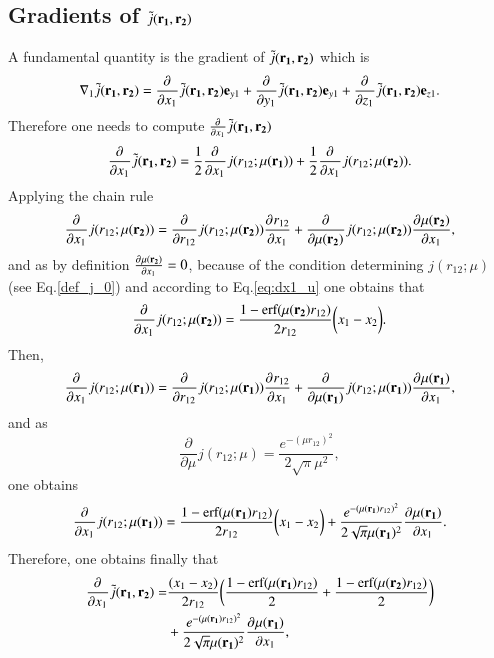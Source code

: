 \documentclass[aip,jcp,reprint,noshowkeys,superscriptaddress]{revtex4-1}
\newcommand{\deriv}[3]{\frac{\partial^{#3} #1}{\partial {#2}^{#3}}}
\newcommand{\bd}[1]{{\bf {#1}}}
\newcommand{\mur}[1]{\mu({\bf r_{#1}})}
\begin{document}
\subsection{Gradients of $\tilde{j}(\bd{r_1},\bd{r_2})$}
A fundamental quantity is the gradient of $\tilde{j}(\bd{r_1},\bd{r_2})$ which is 
\begin{equation}
 \nabla_1 \tilde{j}(\bd{r_1},\bd{r_2}) = \deriv{}{x_1}{} \tilde{j}(\bd{r_1},\bd{r_2}) {\bf e}_{y1} + \deriv{}{y_1}{} \tilde{j}(\bd{r_1},\bd{r_2}) {\bf e}_{y1} + \deriv{}{z_1}{} \tilde{j}(\bd{r_1},\bd{r_2}) {\bf e}_{z1}.
\end{equation}
Therefore one needs to compute $\deriv{}{x_1}{} \tilde{j}(\bd{r_1},\bd{r_2})$
\begin{equation}
 \deriv{}{x_1}{} \tilde{j}(\bd{r_1},\bd{r_2}) = \frac{1}{2}\deriv{}{x_1}{} j(r_{12};\mur{1}) 
                                               +\frac{1}{2}\deriv{}{x_1}{} j(r_{12};\mur{2}) .
\end{equation}
Applying the chain rule 
\begin{equation}
 \deriv{}{x_1}{} j(r_{12};\mur{2}) = \deriv{}{r_{12}}{} j(r_{12};\mur{2})\deriv{r_{12}}{x_1}{} + \deriv{}{\mur{2}}{}j(r_{12};\mur{2}) \deriv{\mur{2}}{x_1}{},
\end{equation}
and as by definition $\deriv{\mur{2}}{x_1}{} = 0$, because 
of the condition determining $j(r_{12};\mu)$ (see Eq.\eqref{def_j_0}) and according to Eq.\eqref{eq:dx1_u} one obtains that 
\begin{equation}
 \deriv{}{x_1}{} j(r_{12};\mur{2}) = \frac{1 - \text{erf}(\mur{2} r_{12})}{2 r_{12}} \bigg(x_1 - x_2 \bigg).
\end{equation}
Then, 
\begin{equation}
 \deriv{}{x_1}{} j(r_{12};\mur{1}) = \deriv{}{r_{12}}{} j(r_{12};\mur{1})\deriv{r_{12}}{x_1}{} + \deriv{}{\mur{1}}{}j(r_{12};\mur{1}) \deriv{\mur{1}}{x_1}{},
\end{equation}
and as 
\begin{equation}
 \label{eq:d_dmu_j}
 \deriv{}{\mu}{}j(r_{12};\mu) = \frac{e^{-(\mu r_{12})^2}}{2\sqrt{\pi} \mu^2},
\end{equation}
one obtains 
\begin{equation}
 \deriv{}{x_1}{} j(r_{12};\mur{1}) = \frac{1 - \text{erf}(\mur{1} r_{12})}{2 r_{12}} \bigg(x_1 - x_2 \bigg) + \frac{e^{-(\mur{1} r_{12})^2}}{2\sqrt{\pi} \mur{1}^2} \deriv{\mur{1}}{x_1}{}.
\end{equation}
Therefore, one obtains finally that 
\begin{equation}
 \label{eq:d_dx1_jtilde}
 \begin{aligned}
 \deriv{}{x_1}{} \tilde{j}(\bd{r_1},\bd{r_2}) = & \frac{(x_1 - x_2)}{2 r_{12}} 
 \bigg( \frac{1 - \text{erf}(\mur{1} r_{12})}{2} + \frac{1 - \text{erf}(\mur{2} r_{12})}{2}  \bigg) \\
                 & + \frac{e^{-(\mur{1} r_{12})^2}}{2\sqrt{\pi} \mur{1}^2} \deriv{\mur{1}}{x_1}{},
 \end{aligned}
\end{equation}
\end{document}
